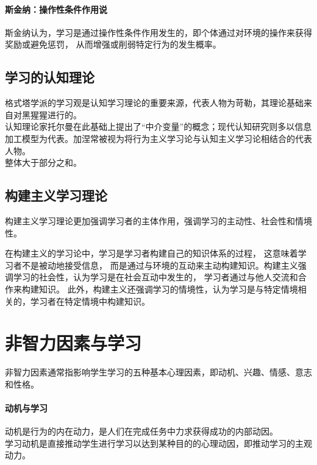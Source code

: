 \documentclass[b5paper,11pt]{article}
\begin{document}
\vspace{1.5em}
\noindent
\paragraph{斯金纳：操作性条件作用说}
斯金纳认为，学习是通过操作性条件作用发生的，即个体通过对环境的操作来获得奖励或避免惩罚，
从而增强或削弱特定行为的发生概率。

\subsection*{学习的认知理论}
格式塔学派的学习观是认知学习理论的重要来源，代表人物为\textcolor{ctp-peach}{苛勒}，其理论基础来自对黑猩猩进行的。 \\
认知理论家\textcolor{ctp-peach}{托尔曼}在此基础上提出了“中介变量”的概念；现代认知研究则多以信息加工模型为代表。\textcolor{ctp-peach}{加涅}常被视为将\textcolor{ctp-red}{行为主义学习论}与\textcolor{ctp-red}{认知主义学习论}相结合的代表人物。\\
\textcolor{ctp-red}{整体大于部分之和}。

\subsection*{构建主义学习理论}
构建主义学习理论更加强调学习者的主体作用，强调学习的主动性、社会性和情境性。

在构建主义的学习论中，\textcolor{ctp-teal}{学习是学习者构建自己的知识体系的过程}，
这意味着学习者不是\textcolor{ctp-peach}{被动地接受信息}，
而是通过与环境的互动来\textcolor{ctp-red}{主动构建知识}。构建主义强调学习的社会性，认为学习是在社会互动中发生的，
学习者通过与他人交流和合作来构建知识。
此外，构建主义还强调学习的情境性，认为学习是与特定情境相关的，学习者在特定情境中构建知识。

\section{非智力因素与学习}
\noindent
非智力因素通常指影响学生学习的五种基本心理因素，即\textcolor{ctp-red}{动机、兴趣、情感、意志和性格}。
\paragraph{动机与学习}
\textcolor{ctp-subtext1}{动机是行为的内在动力，是人们在完成任务中力求获得成功的内部动因。} \\
\textcolor{ctp-subtext1}{学习动机是直接推动学生进行学习以达到某种目的的心理动因，即推动学习的主观动力。}
\end{document}
